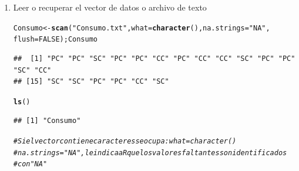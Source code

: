 \documentclass[12pt,letterpaper]{article}\usepackage[]{graphicx}\usepackage[]{color}
\makeatletter
\newcommand{\hlnum}[1]{\textcolor[rgb]{0.686,0.059,0.569}{#1}}%
\newcommand{\hlstr}[1]{\textcolor[rgb]{0.192,0.494,0.8}{#1}}%
\newcommand{\hlcom}[1]{\textcolor[rgb]{0.678,0.584,0.686}{\textit{#1}}}%
\newcommand{\hlstd}[1]{\textcolor[rgb]{0.345,0.345,0.345}{#1}}%
\newcommand{\hlkwb}[1]{\textcolor[rgb]{0.69,0.353,0.396}{#1}}%
\newcommand{\hlkwc}[1]{\textcolor[rgb]{0.333,0.667,0.333}{#1}}%
\newcommand{\hlkwd}[1]{\textcolor[rgb]{0.737,0.353,0.396}{\textbf{#1}}}%
\newenvironment{kframe}{%
 \def\at@end@of@kframe{}%
 \ifinner\ifhmode%
  \def\at@end@of@kframe{\end{minipage}}%
  \begin{minipage}{\columnwidth}%
 \fi\fi%
 \def\FrameCommand##1{\hskip\@totalleftmargin \hskip-\fboxsep
 \colorbox{shadecolor}{##1}\hskip-\fboxsep
     \hskip-\linewidth \hskip-\@totalleftmargin \hskip\columnwidth}%
 \MakeFramed {\advance\hsize-\width
   \@totalleftmargin\z@ \linewidth\hsize
   \@setminipage}}%
 {\par\unskip\endMakeFramed%
 \at@end@of@kframe}
\newenvironment{knitrout}{}{} %
\makeatother
\begin{document}
\begin{enumerate}
\item Leer o recuperar el vector de datos o archivo de texto 
\begin{knitrout}
\color{fgcolor}\begin{kframe}
\begin{alltt}
\hlstd{Consumo} \hlkwb{<-} \hlkwd{scan}\hlstd{(}\hlstr{"Consumo.txt"}\hlstd{,} \hlkwc{what}\hlstd{=} \hlkwd{character}\hlstd{(),} \hlkwc{na.strings} \hlstd{=} \hlstr{"NA"}\hlstd{,}
\hlkwc{flush}\hlstd{=}\hlnum{FALSE}\hlstd{);Consumo}
\end{alltt}
\begin{verbatim}
##  [1] "PC" "PC" "SC" "PC" "PC" "CC" "PC" "CC" "CC" "SC" "PC" "PC" "SC" "CC"
## [15] "SC" "SC" "PC" "PC" "CC" "SC"
\end{verbatim}
\begin{alltt}
\hlkwd{ls}\hlstd{()}
\end{alltt}
\begin{verbatim}
## [1] "Consumo"
\end{verbatim}
\begin{alltt}
\hlcom{# Si el vector contiene caracteresse ocupa: what = character() }
\hlcom{# na.strings ="NA", le indica a R que los valores faltantes son identificados}
\hlcom{# con "NA" }
\end{alltt}
\end{kframe}
\end{knitrout}


\end{enumerate}
\end{document}
